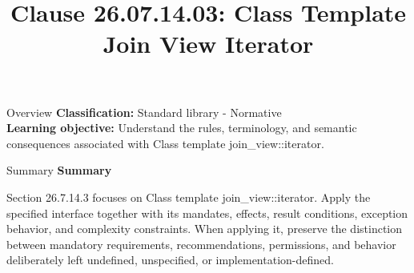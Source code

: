 \documentclass[10pt,letterpaper]{article}
\title{Clause 26.07.14.03: Class Template Join View Iterator}
\author{}
\date{}
\begin{document}
\maketitle
\begin{CornellOverviewBox}{Overview}
\textbf{Classification:} Standard library - Normative\\[2pt]
\textbf{Learning objective:} Understand the rules, terminology, and semantic consequences associated with Class template join\_view::iterator.
\end{CornellOverviewBox}\begin{CornellSummaryBox}{Summary}
{\sffamily\bfseries\color{Accent} Summary}\par\vspace{3pt}Section 26.7.14.3 focuses on Class template join\_view::iterator. Apply the specified interface together with its mandates, effects, result conditions, exception behavior, and complexity constraints. When applying it, preserve the distinction between mandatory requirements, recommendations, permissions, and behavior deliberately left undefined, unspecified, or implementation-defined.
\end{CornellSummaryBox}
\end{document}
